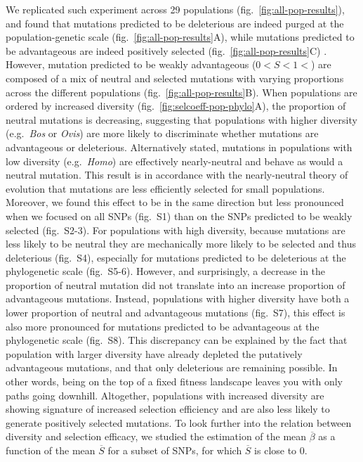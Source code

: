 \documentclass{article}
\newcommand{\Spop}{\beta}
\newcommand{\SpopMean}{\overline{\Spop}}
\newcommand{\Sphy}{S}
\newcommand{\SphyMean}{\overline{\Sphy}}
\begin{document}
    We replicated such experiment across 29 populations (fig.~\ref{fig:all-pop-results}), and found that mutations predicted to be deleterious are indeed purged at the population-genetic scale (fig.~\ref{fig:all-pop-results}A), while mutations predicted to be advantageous are indeed positively selected (fig.~\ref{fig:all-pop-results}C) .
    However, mutation predicted to be weakly advantageous ($0<\Sphy<1<$) are composed of a mix of neutral and selected mutations with varying proportions across the different populations (fig.~\ref{fig:all-pop-results}B).
    When populations are ordered by increased diversity (fig.~\ref{fig:selcoeff-pop-phylo}A), the proportion of neutral mutations is decreasing, suggesting that populations with higher diversity (e.g.~\textit{Bos} or \textit{Ovis}) are more likely to discriminate whether mutations are advantageous or deleterious.
    Alternatively stated, mutations in populations with low diversity (e.g.~\textit{Homo}) are effectively nearly-neutral and behave as would a neutral mutation.
    This result is in accordance with the nearly-neutral theory of evolution that mutations are less efficiently selected for small populations.
    Moreover, we found this effect to be in the same direction but less pronounced when we focused on all SNPs (fig.~S1) than on the SNPs predicted to be weakly selected (fig.~S2-3).
    For populations with high diversity, because mutations are less likely to be neutral they are mechanically more likely to be selected and thus deleterious (fig.~S4), especially for mutations predicted to be deleterious at the phylogenetic scale (fig.~S5-6).
    However, and surprisingly, a decrease in the proportion of neutral mutation did not translate into an increase proportion of advantageous mutations.
    Instead, populations with higher diversity have both a lower proportion of neutral and advantageous mutations (fig.~S7), this effect is also more pronounced for mutations predicted to be advantageous at the phylogenetic scale (fig.~S8).
    This discrepancy can be explained by the fact that population with larger diversity have already depleted the putatively advantageous mutations, and that only deleterious are remaining possible.
    In other words, being on the top of a fixed fitness landscape leaves you with only paths going downhill.
    Altogether, populations with increased diversity are showing signature of increased selection efficiency and are also less likely to generate positively selected mutations.
    To look further into the relation between diversity and selection efficacy, we studied the estimation of the mean $\SpopMean$ as a function of the mean $\SphyMean$ for a subset of SNPs, for which $\SphyMean$ is close to $0$.
\end{document}
